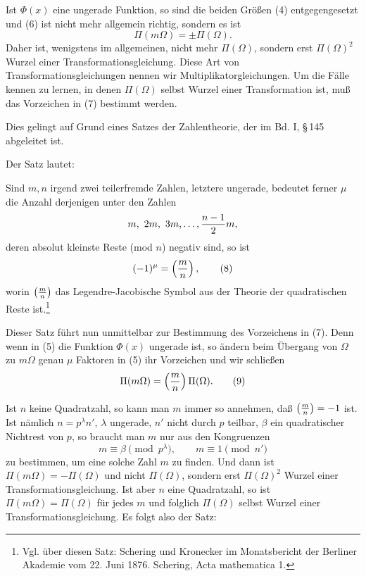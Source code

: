 \documentclass[11pt]{article}
\begin{document}
Ist $\Phi(x)$ eine ungerade Funktion, so sind die beiden Größen (4) entgegengesetzt und
(6) ist nicht mehr allgemein richtig, sondern es ist
\begin{equation}
 \Pi(m\Omega)=\pm\Pi(\Omega).
\tag{7}
\end{equation}
Daher ist, wenigstens im allgemeinen, nicht mehr $\Pi(\Omega)$, sondern erst
$\Pi(\Omega)^2$ Wurzel einer Transformationsgleichung. Diese Art von Transformationsgleichungen
nennen wir Multiplikatorgleichungen. Um die Fälle kennen zu lernen, in denen
$\Pi(\Omega)$ selbst Wurzel einer Transformation ist, muß das Vorzeichen in (7) bestimmt
werden.

Dies gelingt auf Grund eines Satzes der Zahlentheorie, der im Bd. I, \S\,145 abgeleitet ist.

Der Satz lautet:

Sind $m,n$ irgend zwei teilerfremde Zahlen, letztere ungerade, bedeutet ferner $\mu$ die
Anzahl derjenigen unter den Zahlen
\[
 m,\ 2m,\ 3m,\ldots,{n-1\over2}m,
\]
deren absolut kleinste Reste (mod $n$) negativ sind, so ist
\begin{equation}
 (-1)^\mu=\left({m\over n}\right),
\tag{8}
\end{equation}
worin $\left({m\over n}\right)$ das Legendre-Jacobische Symbol aus der Theorie der
quadratischen Reste ist.\footnote{Vgl. über diesen Satz: Schering und Kronecker im Monatsbericht der Berliner Akademie vom 22. Juni 1876. Schering, Acta mathematica 1.}

Dieser Satz führt nun unmittelbar zur Bestimmung des Vorzeichens in (7). Denn wenn in
(5) die Funktion $\Phi(x)$ ungerade ist, so ändern beim Übergang von $\Omega$ zu $m\Omega$
genau $\mu$ Faktoren in (5) ihr Vorzeichen und wir schließen
\begin{equation}
 \Pi(m\Omega)=\left({m\over n}\right)\Pi(\Omega).
\tag{9}
\end{equation}

Ist $n$ keine Quadratzahl, so kann man $m$ immer so annehmen, daß
$\left({m\over n}\right)=-1$ ist. Ist nämlich $n=p^\lambda n'$, $\lambda$ ungerade, $n'$ nicht
durch $p$ teilbar, $\beta$ ein quadratischer Nichtrest von $p$, so braucht man $m$ nur aus
den Kongruenzen
\[
 m\equiv\beta\pmod{p^\lambda},\qquad m\equiv1\pmod{n'}
\]
zu bestimmen, um eine solche Zahl $m$ zu finden. Und dann ist
$\Pi(m\Omega)=-\Pi(\Omega)$ und nicht $\Pi(\Omega)$, sondern erst $\Pi(\Omega)^2$ Wurzel
einer Transformationsgleichung. Ist aber $n$ eine Quadratzahl, so ist
$\Pi(m\Omega)=\Pi(\Omega)$ für jedes $m$ und folglich $\Pi(\Omega)$ selbst Wurzel einer
Transformationsgleichung. Es folgt also der Satz:
\end{document}
